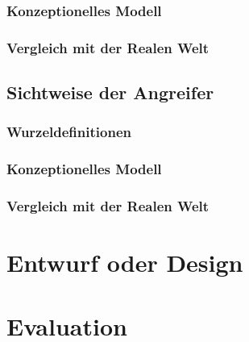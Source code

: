 \documentclass[11pt,a4paper]{report}
\begin{document}
\subsection{Konzeptionelles Modell}

\subsection{Vergleich mit der Realen Welt}

\section{Sichtweise der Angreifer}

\subsection{Wurzeldefinitionen}

\subsection{Konzeptionelles Modell}

\subsection{Vergleich mit der Realen Welt}



\chapter{Entwurf oder Design} \label{chap:design}

\chapter{Evaluation} \label{chap:evaluation}
\end{document}
